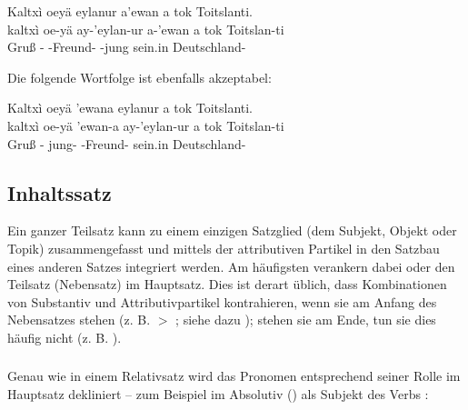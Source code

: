 \begin{interlin}
	\glll \Npawl{}Kaltxì oeyä eylanur a'ewan a tok Toitslanti. \\
	kaltxì oe-yä ay-'eylan-ur a-'ewan a tok Toitslan-ti \\
	Gruß - -Freund- -jung  sein.in Deutschland-\\
\end{interlin}

\noindent Die folgende Wortfolge ist ebenfalls akzeptabel: 

\begin{interlin}
	\glll \Npawl{}Kaltxì oeyä 'ewana eylanur a tok Toitslanti. \\
	kaltxì oe-yä 'ewan-a ay-'eylan-ur a tok Toitslan-ti \\
	Gruß - jung- -Freund-  sein.in Deutschland-\\
\end{interlin}

\subsection{Inhaltssatz} Ein ganzer Teilsatz kann zu einem einzigen Satzglied (dem Subjekt, Objekt oder Topik) zusammengefasst und mittels der attributiven Partikel  in den Satzbau eines anderen Satzes integriert werden. Am häufigsten verankern dabei  oder  den Teilsatz (Nebensatz) im Hauptsatz. Dies ist derart üblich, dass Kombinationen von Substantiv und Attributivpartikel  kontrahieren, wenn sie am Anfang des Nebensatzes stehen (z. B.  $>$ ; siehe dazu ); stehen sie am Ende, tun sie dies häufig nicht (z. B. ). \label{syn:clause-nom}

\subsubsection{} Genau wie in einem Relativsatz wird das Pronomen entsprechend seiner Rolle im Hauptsatz dekliniert -- zum Beispiel im Absolutiv () als Subjekt des Verbs :

